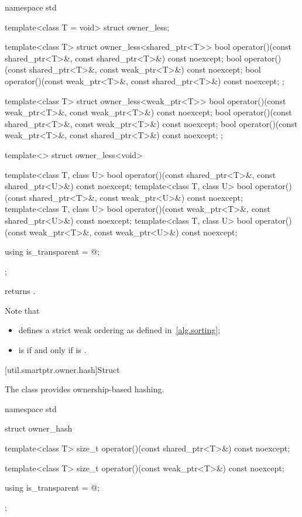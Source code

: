 %
\begin{codeblock}
namespace std {
  template<class T = void> struct owner_less;

  template<class T> struct owner_less<shared_ptr<T>> {
    bool operator()(const shared_ptr<T>&, const shared_ptr<T>&) const noexcept;
    bool operator()(const shared_ptr<T>&, const weak_ptr<T>&) const noexcept;
    bool operator()(const weak_ptr<T>&, const shared_ptr<T>&) const noexcept;
  };

  template<class T> struct owner_less<weak_ptr<T>> {
    bool operator()(const weak_ptr<T>&, const weak_ptr<T>&) const noexcept;
    bool operator()(const shared_ptr<T>&, const weak_ptr<T>&) const noexcept;
    bool operator()(const weak_ptr<T>&, const shared_ptr<T>&) const noexcept;
  };

  template<> struct owner_less<void> {
    template<class T, class U>
      bool operator()(const shared_ptr<T>&, const shared_ptr<U>&) const noexcept;
    template<class T, class U>
      bool operator()(const shared_ptr<T>&, const weak_ptr<U>&) const noexcept;
    template<class T, class U>
      bool operator()(const weak_ptr<T>&, const shared_ptr<U>&) const noexcept;
    template<class T, class U>
      bool operator()(const weak_ptr<T>&, const weak_ptr<U>&) const noexcept;

    using is_transparent = @\unspec@;
  };
}
\end{codeblock}

%
\pnum
{} returns .
\begin{note}
Note that
\begin{itemize}
\item {} defines a strict weak ordering as defined in~\ref{alg.sorting};

\item
{} is 
if and only if  is .
\end{itemize}
\end{note}

[util.smartptr.owner.hash]{Struct }

\pnum
The class  provides ownership-based hashing.

%
\begin{codeblock}
namespace std {
  struct owner_hash {
    template<class T>
      size_t operator()(const shared_ptr<T>&) const noexcept;

    template<class T>
      size_t operator()(const weak_ptr<T>&) const noexcept;

    using is_transparent = @\unspec@;
  };
}
\end{codeblock}

